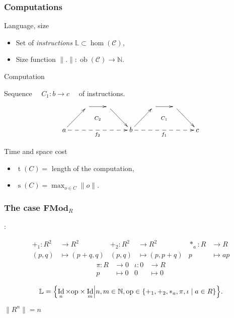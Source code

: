 \documentclass[10pt]{beamer}
\newcommand{\cat}[1]{\mathscr{#1}}
\newcommand{\lcat}[1]{\mathbf{#1}}
\newcommand{\C}{\cat{C}}
\renewcommand{\L}{\cat{L}}
\newcommand{\size}[1]{\lVert#1\rVert}
\DeclareMathOperator{\ob}{ob}
\DeclareMathOperator{\Id}{Id}
\newcommand{\N}{\mathbb{N}}
\renewcommand{\L}{\mathbb{L}}
\newcommand{\ra}{\rightarrow}
\DeclareMathOperator{\Time}{t}
\DeclareMathOperator{\Space}{s}
\begin{document}
\begin{frame}
  \frametitle{Computations}

  \begin{block}{Language, size}
    \begin{itemize}
    \item Set of \emph{instructions} \hfill $\L \subset \hom(\C)$,
    \item Size function \hfill $\size{.} : \ob(\C)\ra\N$.
    \end{itemize}
  \end{block}

  \begin{block}{Computation}
    \begin{center}
      Sequence $\quad C_1:b\ra c\quad$ of instructions.
    \end{center}
  \end{block}

  \[\xymatrix{
    & \ar[r]\ar@{}[dr]|{C_2} & \ar[dr] &
    & \ar[r]\ar@{}[dr]|{C_1} & \ar[dr] \\
    a \ar[ur]\ar@{-->}[rrr]_{f_2} &&& b
    \ar[ur]\ar@{-->}[rrr]_{f_1} &&& c
  }\]

  \begin{block}{Time and space cost}
    \begin{itemize}
    \item $\Time(C) = $ length of the computation,
    \item $\Space(C) = \max_{o\in C}\size{o}$.
    \end{itemize}
  \end{block}

\end{frame}


\begin{frame}
  \frametitle{The case $\lcat{FMod}_R$}
  \cite{BLS03} :

  \begin{align*}
    +_1 : R^2 &\ra R^2         &   +_2 : R^2&\ra R^2       &  *_a : R&\ra R\\
    (p,q)&\mapsto(p+q,q)  &      (p,q)&\mapsto(p,p+q) &       p&\mapsto ap
  \end{align*}
  \begin{align*}
    \pi : R&\ra 0     &  \iota : 0&\ra R   \\
          p&\mapsto0  &          0&\mapsto0
  \end{align*}
  
  \begin{block}{}
    \begin{equation*}
      \label{eq:linlang}
      \L = \Bigl\{\Id_n\times\mathrm{op}\times\Id_m \Bigl\lvert
      n,m\in\N, \mathrm{op}\in\{+_1,+_2,*_a,\pi,\iota\;|\;a\in R\} \Bigr\}
      \text{.}
    \end{equation*}
  \end{block}

  \begin{block}{}
    \begin{center}
      $\size{R^n} = n$
    \end{center}
  \end{block}

\end{frame}
\end{document}

